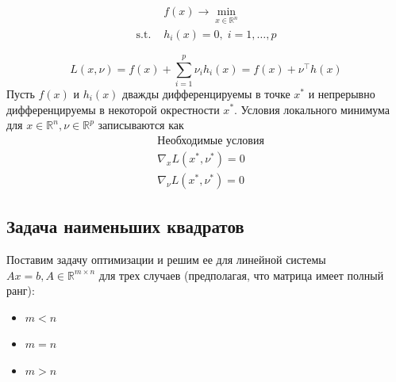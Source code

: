 \documentclass[
  russian,
  letterpaper,
  DIV=11,
  numbers=noendperiod]{scrartcl}
\providecommand{\tightlist}{%
  \setlength{\itemsep}{0pt}\setlength{\parskip}{0pt}}
\begin{document}
\[
\tag{ECP}
\begin{split}
& f(x) \to \min\limits_{x \in \mathbb{R}^n} \\
\text{s.t. } & h_i(x) = 0, \; i = 1,\ldots, p
\end{split}
\]

\[
L(x, \nu) = f(x) + \sum\limits_{i=1}^p\nu_i h_i(x) = f(x) + \nu^\top h(x)
\] Пусть \(f(x)\) и \(h_i(x)\) дважды дифференцируемы в точке \(x^*\) и
непрерывно дифференцируемы в некоторой окрестности \(x^*\). Условия
локального минимума для \(x \in \mathbb{R}^n, \nu \in \mathbb{R}^p\)
записываются как \[
\begin{split}
& \text{Необходимые условия} \\
& \nabla_x L(x^*, \nu^*) = 0 \\
& \nabla_\nu L(x^*, \nu^*) = 0
\end{split}
\]

\subsection{Задача наименьших
квадратов}\label{ux437ux430ux434ux430ux447ux430-ux43dux430ux438ux43cux435ux43dux44cux448ux438ux445-ux43aux432ux430ux434ux440ux430ux442ux43eux432}

\begin{tcolorbox}[enhanced jigsaw, opacityback=0, coltitle=black, left=2mm, colframe=quarto-callout-color-frame, rightrule=.15mm, titlerule=0mm, leftrule=.75mm, breakable, colback=white, bottomrule=.15mm, bottomtitle=1mm, toptitle=1mm, opacitybacktitle=0.6, title=\textcolor{quarto-callout-color}{\faInfo}\hspace{0.5em}{Example}, colbacktitle=quarto-callout-color!10!white, arc=.35mm, toprule=.15mm]

Поставим задачу оптимизации и решим ее для линейной системы
\(Ax = b, A \in \mathbb{R}^{m \times n}\) для трех случаев (предполагая,
что матрица имеет полный ранг):

\begin{itemize}
\tightlist
\item
  \(m < n\)
\item
  \(m = n\)
\item
  \(m > n\)
\end{itemize}

\end{tcolorbox}
\end{document}
